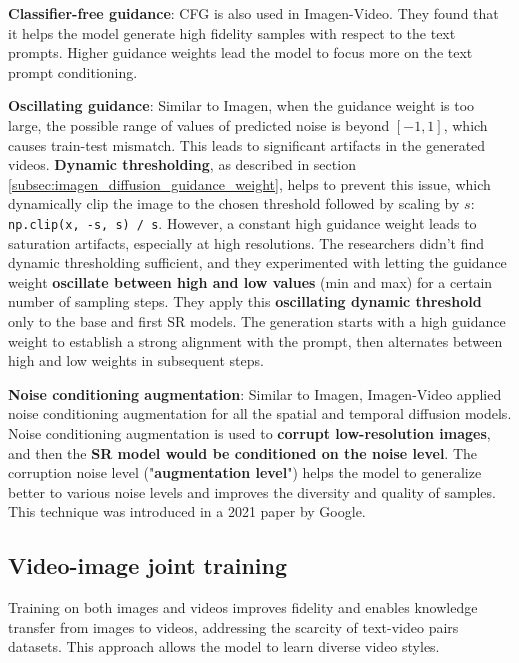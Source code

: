 \textbf{Classifier-free guidance}: CFG is also used in Imagen-Video. They found that it helps the model generate high fidelity samples with respect to the text prompts. Higher guidance weights lead the model to focus more on the text prompt conditioning.

\textbf{Oscillating guidance}: Similar to Imagen, when the guidance weight is too large, the possible range of values of predicted noise is beyond $[-1, 1]$, which causes train-test mismatch. This leads to significant artifacts in the generated videos. \textbf{Dynamic thresholding}, as described in section \ref{subsec:imagen_diffusion_guidance_weight}, helps to prevent this issue, which dynamically clip the image to the chosen threshold followed by scaling by $s$: \texttt{np.clip(x, -s, s) / s}. However, a constant high guidance weight leads to saturation artifacts, especially at high resolutions. The researchers didn't find dynamic thresholding sufficient, and they experimented with letting the guidance weight \textbf{oscillate between high and low values} (min and max) for a certain number of sampling steps. They apply this \textbf{oscillating dynamic threshold} only to the base and first SR models. The generation starts with a high guidance weight to establish a strong alignment with the prompt, then alternates between high and low weights in subsequent steps.

\textbf{Noise conditioning augmentation}: Similar to Imagen, Imagen-Video applied noise conditioning augmentation for all the spatial and temporal diffusion models. Noise conditioning augmentation is used to \textbf{corrupt low-resolution images}, and then the \textbf{SR model would be conditioned on the noise level}. The corruption noise level ("\textbf{augmentation level}") helps the model to generalize better to various noise levels and improves the diversity and quality of samples. This technique was introduced in a 2021 paper \cite{cascaded_diffusion_models} by Google.







\subsection{Video-image joint training}

Training on both images and videos improves fidelity and enables knowledge transfer from images to videos, addressing the scarcity of text-video pairs datasets. This approach allows the model to learn diverse video styles.

